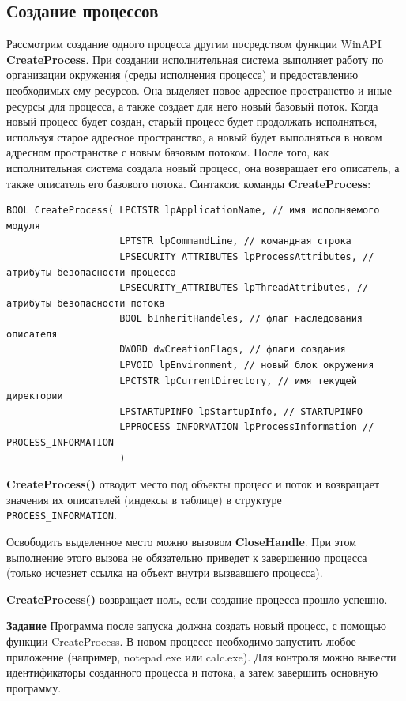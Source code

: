 \documentclass[a4paper]{article}
\begin{document}
\subsection{Создание процессов}
	Рассмотрим создание одного процесса другим посредством функции WinAPI \textbf{CreateProcess}. При создании исполнительная система выполняет работу по организации окружения (среды исполнения процесса) и предоставлению необходимых ему ресурсов. Она выделяет новое адресное пространство и иные ресурсы для процесса, а также создает для него новый базовый поток. Когда новый процесс будет создан, старый процесс будет продолжать исполняться, используя старое адресное пространство, а новый будет выполняться в новом адресном пространстве с новым базовым потоком. После того, как исполнительная система создала новый процесс, она возвращает его описатель, а также описатель его базового потока.
	Синтаксис команды \textbf{CreateProcess}:
	\begin{lstlisting}[style=crs_cpp]
BOOL CreateProcess( LPCTSTR lpApplicationName, // имя исполняемого модуля
					LPTSTR lpCommandLine, // командная строка
					LPSECURITY_ATTRIBUTES lpProcessAttributes, // атрибуты безопасности процесса 
					LPSECURITY_ATTRIBUTES lpThreadAttributes, // атрибуты безопасности потока 
					BOOL bInheritHandeles, // флаг наследования описателя 					
					DWORD dwCreationFlags, // флаги создания
					LPVOID lpEnvironment, // новый блок окружения 
					LPCTSTR lpCurrentDirectory, // имя текущей директории 
					LPSTARTUPINFO lpStartupInfo, // STARTUPINFO
					LPPROCESS_INFORMATION lpProcessInformation // PROCESS_INFORMATION 
					)
	\end{lstlisting}
	
	\textbf{CreateProcess()} отводит место под объекты процесс и поток и возвращает значения их описателей (индексы в таблице) в структуре\\ \texttt{PROCESS\_INFORMATION}.
	
	Освободить выделенное место можно вызовом \textbf{CloseHandle}. При этом выполнение этого вызова не обязательно приведет к завершению процесса (только исчезнет ссылка на объект внутри вызвавшего процесса).
	
	\textbf{CreateProcess()} возвращает ноль, если создание процесса прошло успешно.
	
	\textbf{Задание} Программа после запуска должна создать новый процесс, с помощью функции CreateProcess. В новом процессе необходимо запустить любое приложение (например, notepad.exe или calc.exe). Для контроля можно вывести идентификаторы созданного процесса и потока, а затем завершить основную программу.
	
\end{document}
